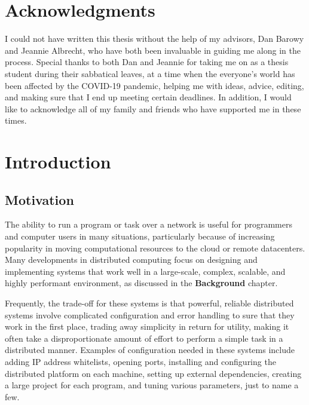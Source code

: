 \documentclass[twoside]{report}
\newcommand{\todoi}[1]{\todo[inline, color=blue!20]{TODO: {#1}}}
\begin{document}
\chapter*{Acknowledgments}

I could not have written this thesis without the help of my advisors, Dan Barowy and Jeannie Albrecht, who have both been invaluable in guiding me along in the process. Special thanks to both Dan and Jeannie for taking me on as a thesis student during their sabbatical leaves, at a time when the everyone's world has been affected by the COVID-19 pandemic, helping me with ideas, advice, editing, and making sure that I end up meeting certain deadlines. In addition, I would like to acknowledge all of my family and friends who have supported me in these times.



\chapter{Introduction}

\section{Motivation}

The ability to run a program or task over a network is useful for programmers and computer users in many situations, particularly because of increasing popularity in moving computational resources to the cloud or remote datacenters.
Many developments in distributed computing focus on designing and implementing systems that work well in a large-scale, complex, scalable, and highly performant environment, as discussed in the \textbf{Background} chapter.

Frequently, the trade-off for these systems is that powerful, reliable distributed systems involve  complicated configuration and error handling to sure that they work in the first place, trading away simplicity in return for utility, making it often take a disproportionate amount of effort to perform a simple task in a distributed manner.
Examples of configuration needed in these systems include adding IP address whitelists, opening ports, installing and configuring the distributed platform on each machine, setting up external dependencies, creating a large project for each program, and tuning various parameters, just to name a few.
\end{document}
